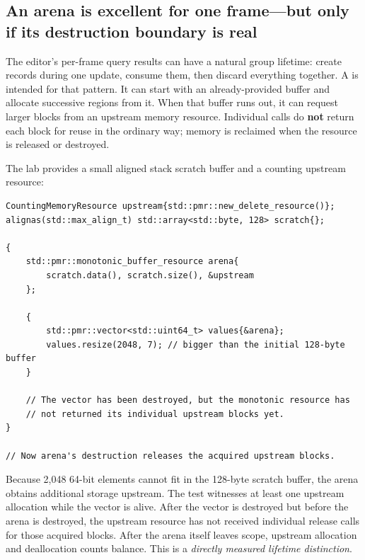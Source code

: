 \subsection{An arena is excellent for one frame---but only if its destruction boundary is real}\label{01-foundations-i-ch006-an-arena-is-excellent-for-one-framebut-only-if-its-destruction-boundary-is-real}

\hypertarget{01-foundations-i-ch006-an-arena-is-excellent-for-one-framebut-only-if-its-destruction-boundary-is-real}{}

The editor's per-frame query results can have a natural group lifetime: create records during one update, consume them, then discard everything together. A  is intended for that pattern. It can start with an already-provided buffer and allocate successive regions from it. When that buffer runs out, it can request larger blocks from an upstream memory resource. Individual  calls do \textbf{not} return each block for reuse in the ordinary way; memory is reclaimed when the resource is released or destroyed.

The lab provides a small aligned stack scratch buffer and a counting upstream resource:

\begin{verbatim}
CountingMemoryResource upstream{std::pmr::new_delete_resource()};
alignas(std::max_align_t) std::array<std::byte, 128> scratch{};

{
    std::pmr::monotonic_buffer_resource arena{
        scratch.data(), scratch.size(), &upstream
    };

    {
        std::pmr::vector<std::uint64_t> values{&arena};
        values.resize(2048, 7); // bigger than the initial 128-byte buffer
    }

    // The vector has been destroyed, but the monotonic resource has
    // not returned its individual upstream blocks yet.
}

// Now arena's destruction releases the acquired upstream blocks.
\end{verbatim}

Because 2,048 64-bit elements cannot fit in the 128-byte scratch buffer, the arena obtains additional storage upstream. The test witnesses at least one upstream allocation while the vector is alive. After the vector is destroyed but before the arena is destroyed, the upstream resource has not received individual release calls for those acquired blocks. After the arena itself leaves scope, upstream allocation and deallocation counts balance. This is a \emph{directly measured lifetime distinction}.

